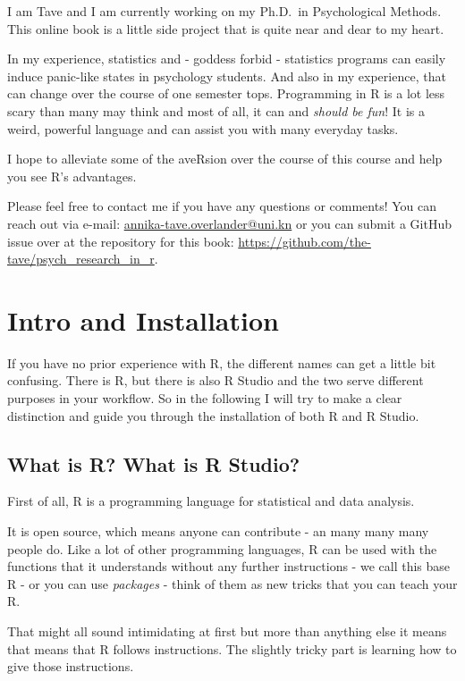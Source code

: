 \documentclass[
]{book}
\begin{document}
I am Tave and I am currently working on my Ph.D.~in Psychological Methods.
This online book is a little side project that is quite near and dear to my heart.

In my experience, statistics and - goddess forbid - statistics programs can easily induce panic-like states in psychology students.
And also in my experience, that can change over the course of one semester tops.
Programming in R is a lot less scary than many may think and most of all, it can and \emph{should be fun}!
It is a weird, powerful language and can assist you with many everyday tasks.

I hope to alleviate some of the aveRsion over the course of this course and help you see R's advantages.

Please feel free to contact me if you have any questions or comments! You can reach out via e-mail: \url{annika-tave.overlander@uni.kn} or you can submit a GitHub issue over at the repository for this book: \url{https://github.com/the-tave/psych_research_in_r}.

\chapter{Intro and Installation}\label{intro-and-installation}

If you have no prior experience with R, the different names can get a little bit confusing.
There is R, but there is also R Studio and the two serve different purposes in your workflow.
So in the following I will try to make a clear distinction and guide you through the installation of both R and R Studio.

\section{What is R? What is R Studio?}\label{what-is-r-what-is-r-studio}

First of all, R is a programming language for statistical and data analysis.

It is open source, which means anyone can contribute - an many many many people do.
Like a lot of other programming languages, R can be used with the functions that it understands without any further instructions - we call this base R - or you can use \emph{packages} - think of them as new tricks that you can teach your R.

That might all sound intimidating at first but more than anything else it means that means that R follows instructions.
The slightly tricky part is learning how to give those instructions.
\end{document}
